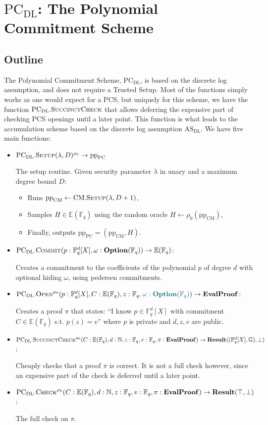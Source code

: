 \documentclass[
]{article}
\providecommand{\tightlist}{%
  \setlength{\itemsep}{0pt}\setlength{\parskip}{0pt}}
\newcommand*\Fb{\mathbb{F}}
\newcommand*\Nb{\mathbb{N}}
\newcommand*\Eb{\mathbb{E}}
\newcommand*\Gb{\mathbb{G}}
\renewcommand*\l{\lambda}
\renewcommand*\o{\omega}
\newcommand{\mathblue}[1]{\mathcolor{GbBlueDk}{#1}}
\newcommand*{\from}{\gets}
\newcommand*{\pp}{\mathrm{pp}}
\newcommand*{\Setup}{\mathrm{\text{S{\scriptsize ETUP}}}}
\newcommand*{\Commit}{\mathrm{\text{C{\scriptsize OMMIT}}}}
\newcommand*{\PC}{\text{PC}}
\newcommand*{\PCDL}{\text{PC}_{\text{DL}}}
\newcommand*{\PCDLSetup}{\PCDL.\Setup}
\newcommand*{\PCDLCommit}{\PCDL.\Commit}
\newcommand*{\PCDLOpen}{\PCDL.\mathrm{\text{O\scriptsize PEN}}}
\newcommand*{\PCDLSuccinctCheck}{\PCDL.\mathrm{\text{S{\scriptsize UCCINCT}C{\scriptsize HECK}}}}
\newcommand*{\PCDLCheck}{\PCDL.\mathrm{\text{C\scriptsize HECK}}}
\newcommand*{\ASDL}{\text{AS}_{\text{DL}}}
\newcommand*{\CM}{\mathrm{\text{CM}}}
\newcommand*{\CMSetup}{\CM.\Setup}
\newcommand*\Result{\mathbf{Result}}
\newcommand*\Option{\mathbf{Option}}
\newcommand*\EvalProof{\mathbf{EvalProof}}
\begin{document}
\newpage

\section{\texorpdfstring{\(\PCDL\): The Polynomial Commitment
Scheme}{\textbackslash PCDL: The Polynomial Commitment Scheme}}\label{pcdl-the-polynomial-commitment-scheme}

\subsection{Outline}\label{outline}

The Polynomial Commitment Scheme, \(\PCDL\), is based on the discrete
log assumption, and does not require a Trusted Setup. Most of the
functions simply works as one would expect for a PCS, but uniquely for
this scheme, we have the function \(\PCDLSuccinctCheck\) that allows
deferring the expensive part of checking PCS openings until a later
point. This function is what leads to the accumulation scheme based on
the discrete log assumption \(\ASDL\). We have five main functions:

\begin{itemize}
\item
  \(\PCDLSetup(\l, D)^{\rho_0} \to \pp_\PC\)

  The setup routine. Given security parameter \(\l\) in unary and a
  maximum degree bound \(D\):

  \begin{itemize}
  \tightlist
  \item
    Runs \(\pp_\CM \from \CMSetup(\l, D + 1)\),
  \item
    Samples \(H \in \Eb(\Fb_q)\) using the random oracle
    \(H \from \rho_0(\pp_\CM)\),
  \item
    Finally, outputs \(\pp_\PC = (\pp_\CM, H)\).
  \end{itemize}
\item
  \(\PCDLCommit(p: \Fb^d_q[X]{, \o: \Option(\Fb_q)}) \to \Eb(\Fb_q)\):

  Creates a commitment to the coefficients of the polynomial \(p\) of
  degree \(d\) with optional hiding \(\o\), using pedersen commitments.
\item
  \(\PCDLOpen^{\rho_0}(p: \Fb^d_q[X], C: \Eb(\Fb_q), z: \Fb_q\mathblue{, \o: \Option(\Fb_q)}) \to \EvalProof\):

  Creates a proof \(\pi\) that states: ``I know \(p \in \Fb^d_q[X]\)
  with commitment \(C \in \Eb(\Fb_q)\) s.t. \(p(z) = v\)'' where \(p\)
  is private and \(d, z, v\) are public.
\item
  \(\PCDLSuccinctCheck^{\rho_0}(C: \Eb(\Fb_q), d: \Nb, z: \Fb_q, v: \Fb_q, \pi: \EvalProof) \to \Result((\Fb^d_q[X], \Gb), \bot)\):

  Cheaply checks that a proof \(\pi\) is correct. It is not a full check
  however, since an expensive part of the check is deferred until a
  later point.
\item
  \(\PCDLCheck^{\rho_0}(C: \Eb(\Fb_q), d: \Nb, z: \Fb_q, v: \Fb_q, \pi: \EvalProof) \to \Result(\top, \bot)\):

  The full check on \(\pi\).
\end{itemize}
\end{document}
